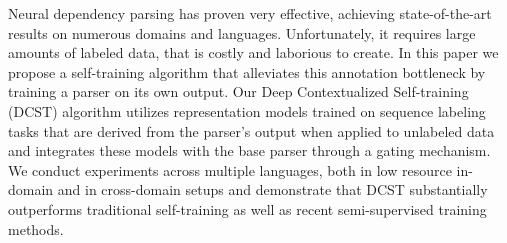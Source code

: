 Neural dependency parsing has proven very effective, achieving state-of-the-art results on numerous domains and languages. Unfortunately, it requires large amounts of labeled data, that is costly and laborious to create. In this paper we propose a self-training algorithm that alleviates this annotation bottleneck by training a parser on its own output. Our Deep Contextualized Self-training (DCST) algorithm utilizes representation models trained on sequence labeling tasks that are derived from the parser’s output when applied to unlabeled data and integrates these models with the base parser through a gating mechanism. We conduct experiments across multiple languages, both in low resource in-domain and in cross-domain setups and demonstrate that DCST substantially outperforms traditional self-training as well as recent semi-supervised training methods.